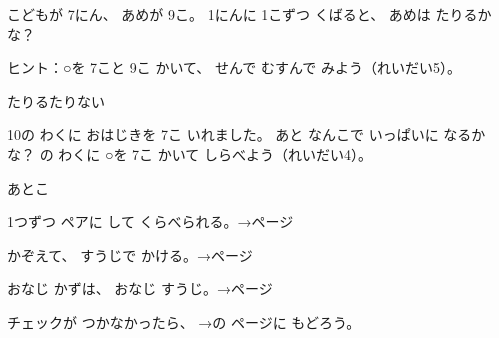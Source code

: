 \bkproblem こどもが 7にん、 あめが 9こ。 1にんに 1こずつ くばると、 あめは たりるかな？\par
{\small\color{bkOrange!58!black}ヒント：○を 7こと 9こ かいて、 せんで むすんで みよう（れいだい5）。}\par\vspace{2pt}
\noindent\hfill たりる\enspace\bkkakikomi[8mm]\hspace{3\zw}たりない\enspace\bkkakikomi[8mm]

\bkproblem 10の わくに おはじきを 7こ いれました。 あと なんこで いっぱいに なるかな？ の わくに ○を 7こ かいて しらべよう（れいだい4）。
\par\nobreak\vspace{2pt}
\noindent\begin{minipage}[c]{0.5\linewidth}\centering
{}
\end{minipage}\hfill
\begin{minipage}[c]{0.46\linewidth}
あと\enspace\bkkakikomi\enspace こ
\end{minipage}

\begin{furikaeri}
\begin{checklist}
\item 1つずつ ペアに して くらべられる。\hfill{\footnotesize\sffamily\color{bkTheme}→\pageref{bk:1-1:pea}ページ}
\item かぞえて、 すうじで かける。\hfill{\footnotesize\sffamily\color{bkTheme}→\pageref{bk:1-1:kazoeru}ページ}
\item おなじ かずは、 おなじ すうじ。\hfill{\footnotesize\sffamily\color{bkTheme}→\pageref{bk:1-1:onaji}ページ}
\end{checklist}
チェックが つかなかったら、 →の ページに もどろう。
\end{furikaeri}

